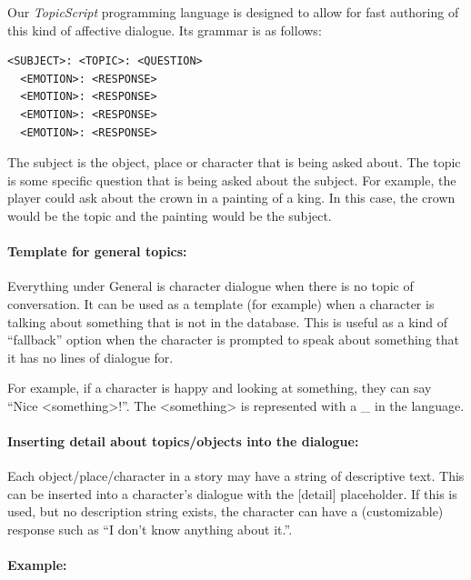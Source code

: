 \documentclass[11pt]{report}
\begin{document}
Our \emph{TopicScript} programming language is designed to allow for fast
authoring of this kind of affective dialogue. Its grammar is as follows:

\begin{lstlisting}
<SUBJECT>: <TOPIC>: <QUESTION>
  <EMOTION>: <RESPONSE>
  <EMOTION>: <RESPONSE>
  <EMOTION>: <RESPONSE>
  <EMOTION>: <RESPONSE>
\end{lstlisting}

The subject is the object, place or character that is being asked about. The
topic is some specific question that is being asked about the subject. For
example, the player could ask about the crown in a painting of a king. In this
case, the crown would be the topic and the painting would be the subject.

\paragraph{Template for general topics:}

Everything under General is character dialogue when there is no topic of
conversation. It can be used as a template (for example) when a character is
talking about something that is not in the database. This is useful as a kind of
``fallback'' option when the character is prompted to speak about something that
it has no lines of dialogue for.

For example, if a character is happy and looking at something, they can say “Nice <something>!”. The <something> is represented with a _ in the language.

\paragraph{Inserting detail about topics/objects into the dialogue:}

Each object/place/character in a story may have a string of descriptive text. This can be inserted into a character’s dialogue with the [detail] placeholder. If this is used, but no description string exists, the character can have a (customizable) response such as “I don’t know anything about it.”.

\paragraph{Example:}
\end{document}
